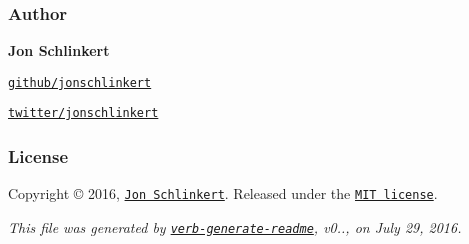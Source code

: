 

\subsubsection*{Author}

{\bfseries Jon Schlinkert}


\begin{DoxyItemize}
\item \href{https://github.com/jonschlinkert}{\tt github/jonschlinkert}
\item \href{http://twitter.com/jonschlinkert}{\tt twitter/jonschlinkert}
\end{DoxyItemize}

\subsubsection*{License}

Copyright © 2016, \href{https://github.com/jonschlinkert}{\tt Jon Schlinkert}. Released under the \href{https://github.com/jonschlinkert/kind-of/blob/master/LICENSE}{\tt M\+IT license}.





{\itshape This file was generated by \href{https://github.com/verbose/verb-generate-readme}{\tt verb-\/generate-\/readme}, v0.., on July 29, 2016.} 